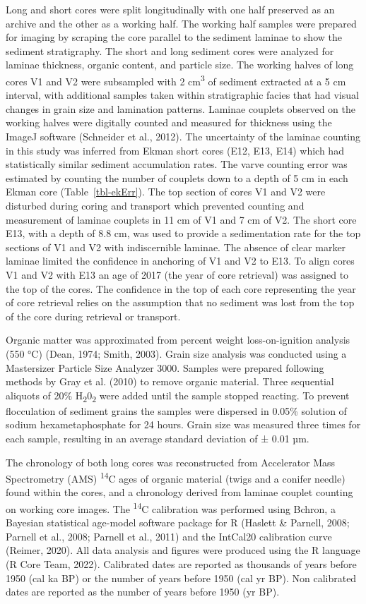\documentclass[
  letterpaper,
  DIV=11,
  numbers=noendperiod]{scrartcl}
\begin{document}
Long and short cores were split longitudinally with one half preserved
as an archive and the other as a working half. The working half samples
were prepared for imaging by scraping the core parallel to the sediment
laminae to show the sediment stratigraphy. The short and long sediment
cores were analyzed for laminae thickness, organic content, and particle
size. The working halves of long cores V1 and V2 were subsampled with 2
cm\textsuperscript{3} of sediment extracted at a 5 cm interval, with
additional samples taken within stratigraphic facies that had visual
changes in grain size and lamination patterns. Laminae couplets observed
on the working halves were digitally counted and measured for thickness
using the ImageJ software (Schneider et al., 2012). The uncertainty of
the laminae counting in this study was inferred from Ekman short cores
(E12, E13, E14) which had statistically similar sediment accumulation
rates. The varve counting error was estimated by counting the number of
couplets down to a depth of 5 cm in each Ekman core
(Table~\ref{tbl-ekErr}). The top section of cores V1 and V2 were
disturbed during coring and transport which prevented counting and
measurement of laminae couplets in 11 cm of V1 and 7 cm of V2. The short
core E13, with a depth of 8.8 cm, was used to provide a sedimentation
rate for the top sections of V1 and V2 with indiscernible laminae. The
absence of clear marker laminae limited the confidence in anchoring of
V1 and V2 to E13. To align cores V1 and V2 with E13 an age of 2017 (the
year of core retrieval) was assigned to the top of the cores. The
confidence in the top of each core representing the year of core
retrieval relies on the assumption that no sediment was lost from the
top of the core during retrieval or transport.

Organic matter was approximated from percent weight loss-on-ignition
analysis (550 °C) (Dean, 1974; Smith, 2003). Grain size analysis was
conducted using a Mastersizer Particle Size Analyzer 3000. Samples were
prepared following methods by Gray et al. (2010) to remove organic
material. Three sequential aliquots of 20\%
H\textsubscript{2}0\textsubscript{2} were added until the sample stopped
reacting. To prevent flocculation of sediment grains the samples were
dispersed in 0.05\% solution of sodium hexametaphosphate for 24 hours.
Grain size was measured three times for each sample, resulting in an
average standard deviation of ± 0.01 µm.

The chronology of both long cores was reconstructed from Accelerator
Mass Spectrometry (AMS) \textsuperscript{14}C ages of organic material
(twigs and a conifer needle) found within the cores, and a chronology
derived from laminae couplet counting on working core images. The
\textsuperscript{14}C calibration was performed using Bchron, a Bayesian
statistical age-model software package for R (Haslett \& Parnell, 2008;
Parnell et al., 2008; Parnell et al., 2011) and the IntCal20 calibration
curve (Reimer, 2020). All data analysis and figures were produced using
the R language (R Core Team, 2022). Calibrated dates are reported as
thousands of years before 1950 (cal ka BP) or the number of years before
1950 (cal yr BP). Non calibrated dates are reported as the number of
years before 1950 (yr BP).
\end{document}

